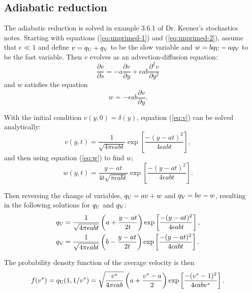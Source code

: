 \documentclass{article}
\newcommand{\tn}{\textnormal}
\newcommand{\Pder}[2]{\frac{\partial #1}{\partial #2}}
\begin{document}
\subsection{Adiabatic reduction}
\label{sec:adb-red}

The adiabatic reduction is solved in example 3.6.1 of Dr. Keener's
stochastics notes. Starting with equations (\ref{eq:unprimed-1}) and
(\ref{eq:unprimed-2}), assume that $\epsilon \ll 1$ and define $v =
q_\tn{U} + q_\tn{V}$ to be the slow variable and $w = b q_\tn{U} - a
q_\tn{V}$ to be the fast variable. Then $v$ evolves as an
advection-diffusion equation:
\begin{equation}
  \label{eq:v}
  \Pder{v}{s} = -a \Pder{v}{y} + \epsilon a b \frac{\partial^2
    v}{\partial y^2}
\end{equation}
and $w$ satisfies the equation
\begin{equation}
  \label{eq:w}
  w = -\epsilon a b \Pder{v}{y}.
\end{equation}

With the initial condition $v(y, 0) = \delta(y)$, equation
(\ref{eq:v}) can be solved analytically:
\begin{equation}
  \label{eq:v-soln}
  v(y, t) = \frac{1}{\sqrt{4 \pi \epsilon a b t}} \exp \left[ \frac{-(y
      - at)^2}{4 \epsilon a b t} \right],
\end{equation}
and then using equation (\ref{eq:w}) to find $w$,
\begin{equation}
  \label{eq:w-soln}
  w(y, t) = \frac{y - at}{4t\sqrt{\pi \epsilon a b t}} \exp \left[ \frac{-(y
      - at)^2}{4 \epsilon a b t} \right].
\end{equation}

Then reversing the change of variables, $q_\tn{U} = av + w$ and
$q_\tn{V} = bv - w$, resulting in the following solutions for
$q_\tn{U}$ and $q_\tn{V}$:
\begin{align}
  \label{eq:qu-soln}
  q_\tn{U} &= \frac{1}{\sqrt{4 \pi \epsilon a b t}} \left(a + \frac{y
             - at}{2t} \right) \exp \left[ \frac{-(y - at)^2}{4
             \epsilon a b t} \right], \\
  \label{eq:qv-soln}
  q_\tn{V} &= \frac{1}{\sqrt{4 \pi \epsilon a b t}} \left(b - \frac{y
             - at}{2t} \right) \exp \left[ \frac{-(y - at)^2}{4
             \epsilon a b t} \right].
\end{align}

The probability density function of the average velocity is then
\begin{equation}
  \label{eq:vel-dens}
  f(v^*) = q_\tn{U}(1, 1/v^*) = \sqrt{\frac{v^*}{4 \pi \epsilon a b}}
  \left(a + \frac{v^* - a}{2} \right) \exp\left[ \frac{-(v^* -
      1)^2}{4\epsilon a b v^*} \right].
\end{equation}



\end{document}
